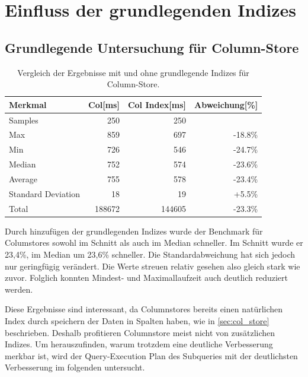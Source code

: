 \section{Einfluss der grundlegenden Indizes}\label{auswertung:basic_indizes}

\subsection{Grundlegende Untersuchung für Column-Store}

\begin{table}[H]
\centering
    \begin{tabularx}{10cm}{lrrr}
        \toprule
        Merkmal             &   Col[ms]    &    Col Index[ms] & Abweichung[\%]\\
        \toprule
        Samples             &   250        &   250      &        \\
        \midrule    
        Max                 &   859        &   697      & -18.8\%\\
        Min                 &   726        &   546      & -24.7\%\\
        Median              &   752        &   574      & -23.6\%\\
        Average             &   755        &   578      & -23.4\%\\
        Standard Deviation  &   18         &   19       & +5.5\%\\
        Total               &   188672     &   144605   & -23.3\%\\
        \bottomrule
    \end{tabularx}
\caption{Vergleich der Ergebnisse mit und ohne grundlegende Indizes für Column-Store.}
\label{tab:basic_index_col}
\end{table}

Durch hinzufügen der grundlegenden Indizes wurde der Benchmark
für Columstores sowohl im Schnitt als auch im Median schneller.
Im Schnitt wurde er 23,4\%, im Median um 23,6\% schneller.
Die Standardabweichung hat sich jedoch nur geringfügig verändert.
Die Werte streuen relativ gesehen also gleich stark wie zuvor.
Folglich konnten Mindest- und Maximallaufzeit auch deutlich reduziert werden. 


Diese Ergebnisse sind interessant,
da Columnstores bereits einen natürlichen Index
durch speichern der Daten in Spalten haben,
wie in \autoref{sec:col_store} beschrieben.
Deshalb profitieren Columnstore meist nicht von zusätzlichen Indizes.
Um herauszufinden, warum trotzdem eine deutliche Verbesserung merkbar ist,
wird der Query-Execution Plan des Subqueries mit der deutlichsten Verbesserung
im folgenden untersucht.

